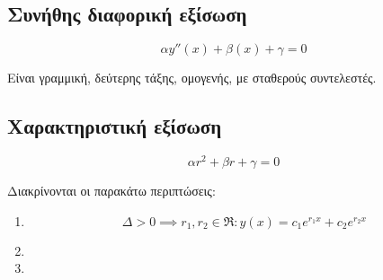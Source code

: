 \documentclass[14pt]{extarticle}
\begin{document}
\subsection{Συνήθης διαφορική εξίσωση}

\begin{equation*}
    \alpha y''(x) + \beta (x)+ \gamma = 0
\end{equation*}

Είναι γραμμική, δεύτερης τάξης, ομογενής, με σταθερούς συντελεστές.


\subsection{Χαρακτηριστική εξίσωση}

\begin{equation*}
    \alpha r^2 + \beta r + \gamma = 0
\end{equation*}

Διακρίνονται οι παρακάτω περιπτώσεις:
\begin{enumerate}
    \item \begin{equation*}
              \Delta > 0 \implies r_1, r_2 \in \Re : y(x) = c_1 e^{r_1x} + c_2 e^{r_2x}
          \end{equation*}
    \item
    \item
\end{enumerate}
\end{document}
